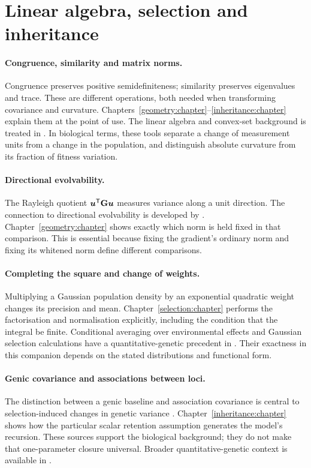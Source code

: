 \section{Linear algebra, selection and inheritance}

\paragraph{Congruence, similarity and matrix norms.}
Congruence preserves positive semidefiniteness; similarity preserves eigenvalues and trace. These are different operations, both needed when transforming covariance and curvature. Chapters~\ref{geometry:chapter}--\ref{inheritance:chapter} explain them at the point of use. The linear algebra and convex-set background is treated in \citet{BoydVandenberghe2004}. In biological terms, these tools separate a change of measurement units from a change in the population, and distinguish absolute curvature from its fraction of fitness variation.

\paragraph{Directional evolvability.}
The Rayleigh quotient $\boldsymbol{u}^{\mathsf T}\mathbf{G}\boldsymbol{u}$ measures variance along a unit direction. The connection to directional evolvability is developed by \citet{HansenHoule2008}. Chapter~\ref{geometry:chapter} shows exactly which norm is held fixed in that comparison. This is essential because fixing the gradient's ordinary norm and fixing its whitened norm define different comparisons.

\paragraph{Completing the square and change of weights.}
Multiplying a Gaussian population density by an exponential quadratic weight changes its precision and mean. Chapter~\ref{selection:chapter} performs the factorisation and normalisation explicitly, including the condition that the integral be finite. Conditional averaging over environmental effects and Gaussian selection calculations have a quantitative-genetic precedent in \citet{Lande1979}. Their exactness in this companion depends on the stated distributions and functional form.

\paragraph{Genic covariance and associations between loci.}
The distinction between a genic baseline and association covariance is central to selection-induced changes in genetic variance \citep{Bulmer1971,Bulmer1974,BartonTurelli1991}. Chapter~\ref{inheritance:chapter} shows how the particular scalar retention assumption generates the model's recursion. These sources support the biological background; they do not make that one-parameter closure universal. Broader quantitative-genetic context is available in \citet{WalshLynch2018}.

